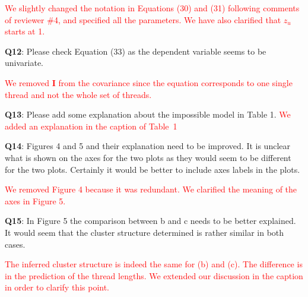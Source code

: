 \documentclass[]{article}
\newcommand\done[1]{\textcolor{red}{#1}}
\begin{document}
	\done{We slightly changed the notation in Equations (30) and (31) following comments of reviewer \#4, and specified all the parameters. We have also clarified that $z_u$ starts at 1. 
	}
	
	\vspace{3mm}
	\textbf{Q12}: Please check Equation (33) as the dependent variable seems to be univariate.
	
	\done{ We removed $\mathbf{I}$ from the covariance since the equation corresponds to one single thread and not the whole set of threads.
	}
	
	
	\vspace{3mm}
	\textbf{Q13}: Please add some explanation about the impossible model in Table 1.
	\done{We added an explanation in the caption of Table~1}
	
	
	\vspace{3mm}
	\textbf{Q14}: Figures 4 and 5 and their explanation need to be improved. It is unclear what is shown on the axes for the two plots as they would seem to be different for the two plots. Certainly it would be better to include axes labels in the plots.
	
	\textcolor{red}{ We removed Figure 4 because it was redundant. We clarified the meaning of the axes in Figure 5.}
	
	\vspace{3mm}
	\textbf{Q15}: In Figure 5 the comparison between b and c needs to be better explained. It would seem that the cluster structure determined is rather similar in both cases.
	
	\textcolor{red}{ The inferred cluster structure is indeed the same for (b) and (c). The difference is in the prediction of the thread lengths. We extended our discussion in the caption in order to clarify this point.
	}
	
\end{document}
